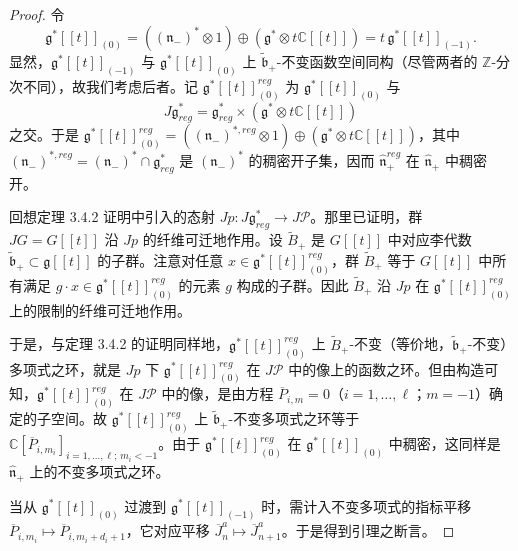 \begin{proof}
令
\[
    \mathfrak g^*[\![t]\!]_{(0)}=((\mathfrak n_-)^*\otimes1)\oplus(\mathfrak g^*\otimes t\mathbb C[[t]])=t\,\mathfrak g^*[\![t]\!]_{(-1)}.
\]
显然，$\mathfrak g^*[\![t]\!]_{(-1)}$ 与 $\mathfrak g^*[\![t]\!]_{(0)}$ 上 $\tilde{\mathfrak b}_+$-不变函数空间同构（尽管两者的 $\mathbb Z$-分次不同），故我们考虑后者。记 $\mathfrak g^*[\![t]\!]^{reg}_{(0)}$ 为 $\mathfrak g^*[\![t]\!]_{(0)}$ 与
\[
    J\mathfrak g^*_{reg}=\mathfrak g^*_{reg}\times(\mathfrak g^*\otimes t\mathbb C[[t]])
\]
之交。于是 $\mathfrak g^*[\![t]\!]^{reg}_{(0)}=((\mathfrak n_-)^{*,reg}\otimes1)\oplus(\mathfrak g^*\otimes t\mathbb C[[t]])$，其中 $(\mathfrak n_-)^{*,reg}=(\mathfrak n_-)^*\cap\mathfrak g^*_{reg}$ 是 $(\mathfrak n_-)^*$ 的稠密开子集，因而 $\hat{\mathfrak n}^{reg}_+$ 在 $\hat{\mathfrak n}_+$ 中稠密开。

回想定理 3.4.2 证明中引入的态射 $Jp:J\mathfrak g^*_{reg}\to J\mathcal P$。那里已证明，群 $JG=G[\![t]\!]$ 沿 $Jp$ 的纤维可迁地作用。设 $\widetilde B_+$ 是 $G[\![t]\!]$ 中对应李代数 $\tilde{\mathfrak b}_+\subset\mathfrak g[\![t]\!]$ 的子群。注意对任意 $x\in\mathfrak g^*[\![t]\!]^{reg}_{(0)}$，群 $\widetilde B_+$ 等于 $G[\![t]\!]$ 中所有满足 $g\cdot x\in\mathfrak g^*[\![t]\!]^{reg}_{(0)}$ 的元素 $g$ 构成的子群。因此 $\widetilde B_+$ 沿 $Jp$ 在 $\mathfrak g^*[\![t]\!]^{reg}_{(0)}$ 上的限制的纤维可迁地作用。

于是，与定理 3.4.2 的证明同样地，$\mathfrak g^*[\![t]\!]^{reg}_{(0)}$ 上 $\widetilde B_+$-不变（等价地，$\tilde{\mathfrak b}_+$-不变）多项式之环，就是 $Jp$ 下 $\mathfrak g^*[\![t]\!]^{reg}_{(0)}$ 在 $J\mathcal P$ 中的像上的函数之环。但由构造可知，$\mathfrak g^*[\![t]\!]^{reg}_{(0)}$ 在 $J\mathcal P$ 中的像，是由方程 $\overline P_{i,m}=0$（$i=1,\dots,\ell$；$m=-1$）确定的子空间。故 $\mathfrak g^*[\![t]\!]^{reg}_{(0)}$ 上 $\tilde{\mathfrak b}_+$-不变多项式之环等于 $\mathbb C[\overline P_{i,m_i}]_{i=1,\dots,\ell;\,m_i<-1}$。由于 $\mathfrak g^*[\![t]\!]^{reg}_{(0)}$ 在 $\mathfrak g^*[\![t]\!]_{(0)}$ 中稠密，这同样是 $\hat{\mathfrak n}_+$ 上的不变多项式之环。

当从 $\mathfrak g^*[\![t]\!]_{(0)}$ 过渡到 $\mathfrak g^*[\![t]\!]_{(-1)}$ 时，需计入不变多项式的指标平移 $\overline P_{i,m_i}\mapsto\overline P_{i,m_i+d_i+1}$，它对应平移 $\overline J^a_n\mapsto\overline J^a_{n+1}$。于是得到引理之断言。
\end{proof}

